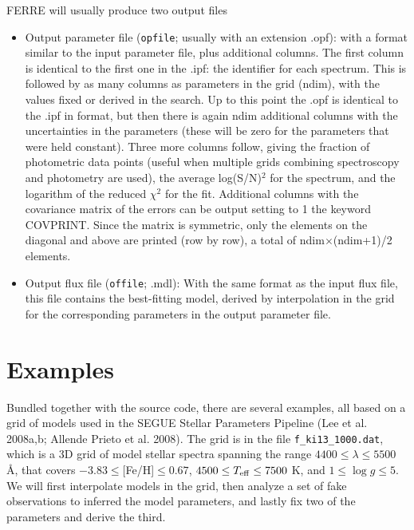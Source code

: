 \documentclass[12pt]{article}
\begin{document}
FERRE will usually produce two output files
\begin{itemize}

\item Output parameter file ({\tt opfile}; usually with an extension .opf): 
with a format similar to the input parameter
file, plus additional columns. The first column is identical to the first one
in the .ipf: the identifier for each spectrum. This is followed by 
as many columns as parameters in the grid (ndim), with the values fixed or 
derived in the search. Up to 
this point the .opf is identical to the .ipf in format, but then there is
again ndim additional columns with the uncertainties in the parameters 
(these will be zero for the parameters that were held constant). Three more 
columns follow, giving the fraction of photometric data points (useful 
when multiple grids combining spectroscopy and photometry are used), the average 
log(S/N)$^2$ for the spectrum, and the logarithm of the reduced $\chi^2$ for the fit. 
Additional columns with the covariance matrix of 
the errors can be output setting to 1 the keyword COVPRINT. Since the matrix is 
symmetric, only the elements on the diagonal and above are printed (row by row), 
a total of ndim$\times$(ndim+1)/2 elements.

\item Output flux file ({\tt offile}; .mdl): With the same format as the input flux file, 
this file contains the best-fitting model, derived by interpolation in the 
grid for the corresponding parameters in the output parameter file.

\end{itemize}

\section{Examples}
\label{test}

Bundled together with the source code, there are several examples, 
all based on a grid of models used in the SEGUE Stellar Parameters  Pipeline
(Lee et al. 2008a,b; Allende Prieto et al. 2008). The grid is in the file
{\tt f\_ki13\_1000.dat}, which is a 3D grid of model stellar spectra spanning 
the range $4400\le \lambda \le 5500$ \AA,
that covers $-3.83\le$[Fe/H]$\le0.67$, $4500\le T_{\rm eff} \le 7500$ K, 
and $1\le \log g \le 5$. We will first interpolate models in the grid, 
then analyze a set of fake observations to inferred the model parameters, and 
lastly fix two of the parameters and derive the third.
\end{document}
